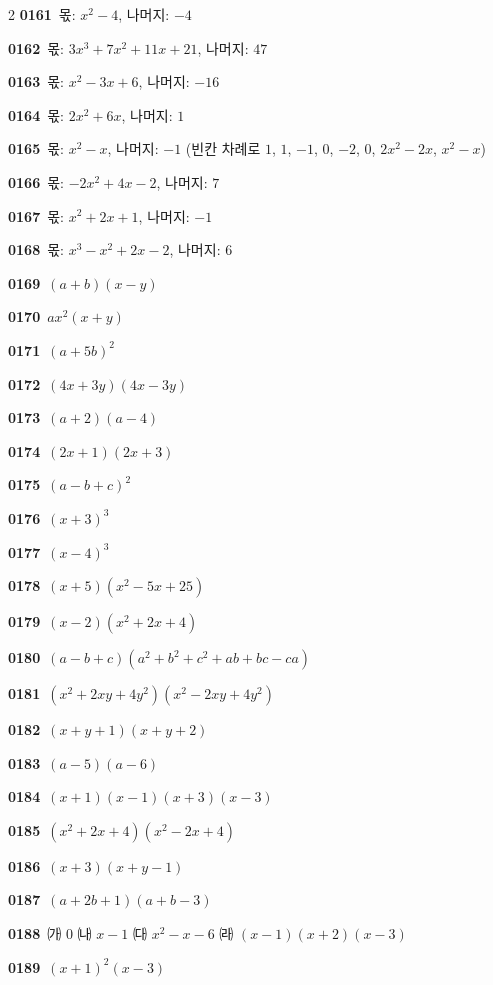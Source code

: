 \documentclass[10pt,a4paper]{article}
\begin{document}
\begin{multicols}{2}
\noindent\textbf{0161}\ 몫: $x^2-4$, 나머지: $-4$\par
\noindent\textbf{0162}\ 몫: $3x^3+7x^2+11x+21$, 나머지: $47$\par
\noindent\textbf{0163}\ 몫: $x^2-3x+6$, 나머지: $-16$\par
\noindent\textbf{0164}\ 몫: $2x^2+6x$, 나머지: $1$\par
\noindent\textbf{0165}\ 몫: $x^2-x$, 나머지: $-1$ (빈칸 차례로 $1$, $1$, $-1$, $0$, $-2$, $0$, $2x^2-2x$, $x^2-x$)\par
\noindent\textbf{0166}\ 몫: $-2x^2+4x-2$, 나머지: $7$\par
\noindent\textbf{0167}\ 몫: $x^2+2x+1$, 나머지: $-1$\par
\noindent\textbf{0168}\ 몫: $x^3-x^2+2x-2$, 나머지: $6$\par
\noindent\textbf{0169}\ $(a+b)(x-y)$\par
\noindent\textbf{0170}\ $ax^2(x+y)$\par
\noindent\textbf{0171}\ $(a+5b)^2$\par
\noindent\textbf{0172}\ $(4x+3y)(4x-3y)$\par
\noindent\textbf{0173}\ $(a+2)(a-4)$\par
\noindent\textbf{0174}\ $(2x+1)(2x+3)$\par
\noindent\textbf{0175}\ $(a-b+c)^2$\par
\noindent\textbf{0176}\ $(x+3)^3$\par
\noindent\textbf{0177}\ $(x-4)^3$\par
\noindent\textbf{0178}\ $(x+5)(x^2-5x+25)$\par
\noindent\textbf{0179}\ $(x-2)(x^2+2x+4)$\par
\noindent\textbf{0180}\ $(a-b+c)(a^2+b^2+c^2+ab+bc-ca)$\par
\noindent\textbf{0181}\ $(x^2+2xy+4y^2)(x^2-2xy+4y^2)$\par
\noindent\textbf{0182}\ $(x+y+1)(x+y+2)$\par
\noindent\textbf{0183}\ $(a-5)(a-6)$\par
\noindent\textbf{0184}\ $(x+1)(x-1)(x+3)(x-3)$\par
\noindent\textbf{0185}\ $(x^2+2x+4)(x^2-2x+4)$\par
\noindent\textbf{0186}\ $(x+3)(x+y-1)$\par
\noindent\textbf{0187}\ $(a+2b+1)(a+b-3)$\par
\noindent\textbf{0188}\ ㈎ $0$ \quad ㈏ $x-1$ \quad ㈐ $x^2-x-6$ \quad ㈑ $(x-1)(x+2)(x-3)$\par
\noindent\textbf{0189}\ $(x+1)^2(x-3)$\par

\end{multicols}
\end{document}
